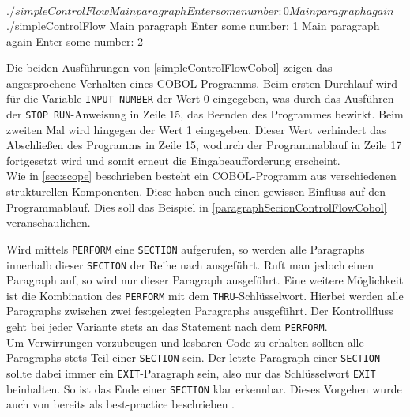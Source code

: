 \sepCodeAndOutputCheck
\begin{shellwindow}
$ ./simpleControlFlow 
Main paragraph
Enter some number: 0
Main paragraph again
$ ./simpleControlFlow 
Main paragraph
Enter some number: 1 
Main paragraph again
Enter some number: 2
\end{shellwindow}

Die beiden Ausführungen von \autoref{simpleControlFlowCobol} zeigen das angesprochene Verhalten eines COBOL-Programms. Beim ersten Durchlauf wird für die Variable \texttt{INPUT-NUMBER} der Wert 0 eingegeben, was durch das Ausführen der \texttt{STOP RUN}-Anweisung in Zeile 15, das Beenden des Programmes bewirkt. Beim zweiten Mal wird hingegen der Wert 1 eingegeben. Dieser Wert verhindert das Abschließen des Programms in Zeile 15, wodurch der Programmablauf in Zeile 17 fortgesetzt wird und somit erneut die Eingabeaufforderung erscheint.\\

Wie in \autoref{sec:scope} beschrieben besteht ein COBOL-Programm aus verschiedenen strukturellen Komponenten. Diese haben auch einen gewissen Einfluss auf den Programmablauf. Dies soll das Beispiel in \autoref{paragraphSecionControlFlowCobol} veranschaulichen.\\

\sepCodeAndOutputCheck
{}

Wird mittels \texttt{PERFORM} eine \texttt{SECTION} aufgerufen, so werden alle Paragraphs innerhalb dieser \texttt{SECTION} der Reihe nach ausgeführt. Ruft man jedoch einen Paragraph auf, so wird nur dieser Paragraph ausgeführt. Eine weitere Möglichkeit ist die Kombination des \texttt{PERFORM} mit dem \texttt{THRU}-Schlüsselwort. Hierbei werden alle Paragraphs zwischen zwei festgelegten Paragraphs ausgeführt. Der Kontrollfluss geht bei jeder Variante stets an das Statement nach dem \texttt{PERFORM}. \\

Um Verwirrungen vorzubeugen und lesbaren Code zu erhalten sollten alle Paragraphs stets Teil einer \texttt{SECTION} sein. Der letzte Paragraph einer \texttt{SECTION} sollte dabei immer ein \texttt{EXIT}-Paragraph sein, also nur das Schlüsselwort \texttt{EXIT} beinhalten. So ist das Ende einer \texttt{SECTION} klar erkennbar. Dieses Vorgehen wurde auch von \citeauthor{richards_enhancing_1984} bereits \citeyear{richards_enhancing_1984} als best-practice beschrieben  \cite{richards_enhancing_1984}.